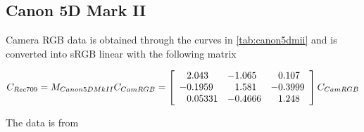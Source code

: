 \newpage

\subsection{Canon 5D Mark II}

Camera \gls{RGB} data is obtained through the curves in
\cref{tab:canon5dmii} and is converted into
\gls{sRGB} linear with the following matrix

\begin{displaymath}
C_{Rec709} = M_{Canon5DMkII} C_{CamRGB} = \left[\begin{array}{r@{.}lr@{.}lr@{.}l}
 2&043   & -1&065  &  0&107  \\
-0&1959  &  1&581  & -0&3999 \\
 0&05331 & -0&4666 &  1&248  \\
\end{array}\right] C_{CamRGB}
\end{displaymath}

The data is from~\cite{jiang2013}

